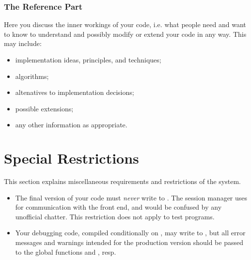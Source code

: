 \vspace{20pt}


\vspace{20pt}


\subsubsection{The Reference Part}

Here you discuss the inner workings of your code, i.e. what people
need and want to know to understand and possibly modify or extend your
code in any way.  This may include:

	\begin{itemize}
	\item
		implementation ideas, principles, and techniques;
	\item
		algorithms;
	\item
		altenatives to implementation decisions;
	\item
		possible extensions;
	\item
		any other information as appropriate.
	\end{itemize}


\section{Special Restrictions}

This section explains miscellaneous requirements and restrictions of
the system.

\begin{itemize}
\item
The final version of your code must {\em never} write to .
The session manager uses  for communication with the front
end, and would be confused by any unofficial chatter.  This
restriction does not apply to test programs.

\item
Your debugging code, compiled conditionally on , may write
to , but all error messages and warnings intended for the
production version should be passed to the global functions
 and , resp.
\end{itemize}


